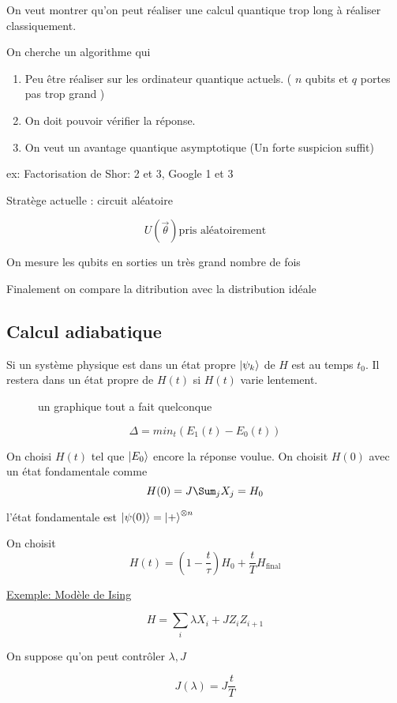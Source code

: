 On veut montrer qu'on peut réaliser une calcul quantique trop long à réaliser classiquement.


On cherche un algorithme qui 

\begin{enumerate}
	\item Peu être réaliser sur les ordinateur quantique actuels. ( $n$ qubits et $q$ portes pas trop grand )
	\item On doit pouvoir vérifier la réponse.
	\item On veut un avantage quantique asymptotique (Un forte suspicion suffit)
\end{enumerate}

ex: Factorisation de Shor: 2 et 3, Google 1 et 3

Stratège actuelle : circuit aléatoire

$$U(\vec \theta ) \text{pris aléatoirement} $$ 

On mesure les qubits en sorties un très grand nombre de fois

Finalement on compare la ditribution avec la distribution idéale 

\subsection{Calcul adiabatique}

\begin{tcolorbox}[title=Théorème adiabatique]
	 Si un système physique est dans un état propre $\ket{\psi_k}$ de $H$ est au temps $t_0$. Il restera dans un état propre de $H(t)$ si $H(t)$ varie lentement.      
\end{tcolorbox}

\begin{figure}[ht]
    \centering
    \caption{un graphique tout a fait quelconque}
    \label{fig:un-graphique-tout-a-fait-quelconque}
\end{figure}

$$\Delta = min_t(E_1(t)-E_0(t))$$ 

\begin{tcolorbox}[title=]
\end{tcolorbox}


On choisi $H(t)$ tel que $\ket{E_0}$ encore la réponse voulue. On choisit $H(0)$  avec un état  fondamentale comme $$H(0) = J \Sum_j X_j = H_0$$ 

l'état fondamentale est $\ket{\psi(0)} = \ket{+}^{ \otimes n }$ 

On choisit $$H(t) = \left(  1- \frac{t}{\tau}   \right) H_0 + \frac{t}{T} H_{\text{final} } $$ 

\underline{Exemple: Modèle de Ising} 

$$H = \sum_i \lambda X_i + J Z_i Z_{i+1} $$ 

On suppose qu'on peut contrôler $\lambda, J$ 

$$J(\lambda) = J \frac{t}{T} $$ 







